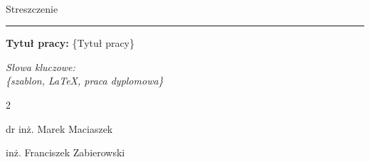	\newpage
	\mbox{ }
	
	\newpage
	{\Large Streszczenie}\\
	{\color{sliwka}\rule[1pt]{\textwidth}{2pt}}
	
	\textbf{Tytuł pracy:} \{Tytuł pracy\}
	


	\vspace{0.025\textheight}
	\textit{Słowa kluczowe:}\\
	\textit{{\{szablon, LaTeX, praca dyplomowa\}}}
	
	\vfill
	
	\begin{multicols}{2}
		\begin{flushleft}
			dr inż. Marek Maciaszek
		\end{flushleft}
		\begin{flushright}
			inż. Franciszek Zabierowski
		\end{flushright}
	\end{multicols}